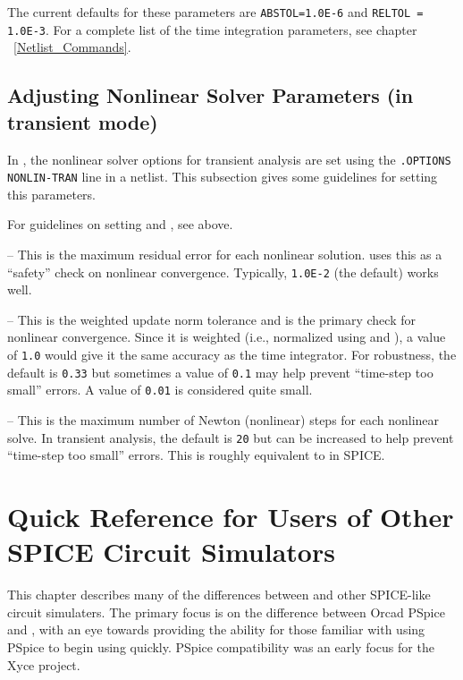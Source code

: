 The current defaults for these parameters are \texttt{ABSTOL=1.0E-6} and
\texttt{RELTOL = 1.0E-3}.  For a complete list of the time integration
parameters, see chapter ~\ref{Netlist_Commands}.

\section{Adjusting Nonlinear Solver Parameters (in transient mode)}

In \Xyce{}, the nonlinear solver options for transient analysis are set using
the \texttt{.OPTIONS NONLIN-TRAN} line in a netlist.  This subsection gives
some guidelines for setting this parameters.
\begin{XyceItemize}
\item For guidelines on setting  and , see above.
\item {} -- This is the maximum residual error for each nonlinear
  solution.  \Xyce{} uses this as a ``safety'' check on nonlinear
  convergence.  Typically, \texttt{1.0E-2} (the default) works well.
\item {} -- This is the weighted update norm tolerance and is
  the primary check for nonlinear convergence.  Since it is weighted (i.e.,
  normalized using  and \mbox{}), a value of
  \texttt{1.0} would give it the same accuracy as the time integrator.  For
  robustness, the default is \texttt{0.33} but sometimes a value of
  \texttt{0.1} may help prevent ``time-step too small'' errors.  A value of
  \texttt{0.01} is considered quite small.
\item {} -- This is the maximum number of Newton (nonlinear)
  steps for each nonlinear solve.  In transient analysis, the default is
  \texttt{20} but can be increased to help prevent ``time-step too small''
  errors.  This is roughly equivalent to  in SPICE.
\end{XyceItemize}

\cleardoublepage

\chapter{Quick Reference for Users of Other SPICE 
Circuit Simulators}
\label{PSpice_Ref}

This chapter describes many of the differences between \Xyce{} and
other SPICE-like circuit simulaters.  The primary focus is on the difference
between Orcad PSpice and \Xyce{}, with an eye towards providing the ability for those
familiar with using PSpice to begin using \Xyce{} quickly.   PSpice compatibility 
was an early focus for the Xyce project.

